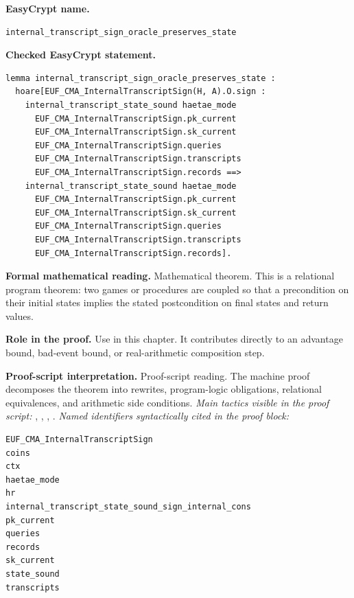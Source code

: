 \begin{formaltheorem}
\noindent\textbf{EasyCrypt name.}
\begin{lstlisting}[language=EasyCrypt,basicstyle=\ttfamily\scriptsize]
internal_transcript_sign_oracle_preserves_state
\end{lstlisting}
\noindent\textbf{Checked EasyCrypt statement.}
\begin{lstlisting}[language=EasyCrypt,basicstyle=\ttfamily\scriptsize]
lemma internal_transcript_sign_oracle_preserves_state :
  hoare[EUF_CMA_InternalTranscriptSign(H, A).O.sign :
    internal_transcript_state_sound haetae_mode
      EUF_CMA_InternalTranscriptSign.pk_current
      EUF_CMA_InternalTranscriptSign.sk_current
      EUF_CMA_InternalTranscriptSign.queries
      EUF_CMA_InternalTranscriptSign.transcripts
      EUF_CMA_InternalTranscriptSign.records ==>
    internal_transcript_state_sound haetae_mode
      EUF_CMA_InternalTranscriptSign.pk_current
      EUF_CMA_InternalTranscriptSign.sk_current
      EUF_CMA_InternalTranscriptSign.queries
      EUF_CMA_InternalTranscriptSign.transcripts
      EUF_CMA_InternalTranscriptSign.records].
\end{lstlisting}
\noindent\textbf{Formal mathematical reading.}
Mathematical theorem. This is a relational program theorem: two games or procedures are coupled so that a precondition on their initial states implies the stated postcondition on final states and return values.

\noindent\textbf{Role in the proof.}
Use in this chapter. It contributes directly to an advantage bound, bad-event bound, or real-arithmetic composition step.

\noindent\textbf{Proof-script interpretation.}
Proof-script reading. The machine proof decomposes the theorem into rewrites, program-logic obligations, relational equivalences, and arithmetic side conditions.
\emph{Main tactics visible in the proof script:} , , , .
\emph{Named identifiers syntactically cited in the proof block:}
\begin{lstlisting}[language=EasyCrypt,basicstyle=\ttfamily\scriptsize]
EUF_CMA_InternalTranscriptSign
coins
ctx
haetae_mode
hr
internal_transcript_state_sound_sign_internal_cons
pk_current
queries
records
sk_current
state_sound
transcripts
\end{lstlisting}

\end{formaltheorem}

